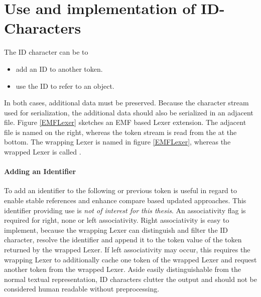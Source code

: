 \section{Use and implementation of ID-Characters}
 
The ID character can be to
\begin{itemize}
	\item add an ID to another token.
	\item use the ID to refer to an object.
\end{itemize}
In both cases, additional data must be preserved. Because the character stream used for serialization, the additional data should also be serialized in an adjacent file. Figure \ref{EMFLexer} sketches an EMF based Lexer extension. The adjacent file is named  on the right, whereas the token stream is read from the  at the bottom. The wrapping Lexer is named  in figure \ref{EMFLexer}, whereas the wrapped Lexer is called .  

\paragraph{Adding an Identifier} To add an identifier to the following or previous token is useful in regard to enable stable references and enhance compare based updated approaches. This identifier providing use is \emph{not of interest for this thesis}. An associativity flag is required for right, none or left associativity.  Right associativity is easy to implement, because the wrapping Lexer can distinguish and filter the ID character, resolve the identifier and append it to the token value of the token returned by the wrapped Lexer. If left associativity may occur, this requires the wrapping Lexer to additionally cache one token of the wrapped Lexer and request another token from the wrapped Lexer. Aside easily distinguishable from the normal textual representation, ID characters clutter the output and should not be considered human readable without preprocessing. 
 
